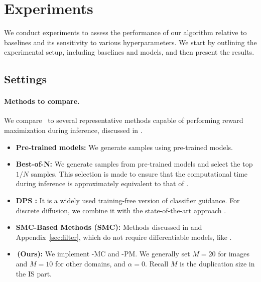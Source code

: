 \vspace{-2mm}
 \section{Experiments}\label{sec:experiment}
\vspace{-2mm}
 We conduct experiments to assess the performance of our algorithm relative to baselines and its sensitivity to various hyperparameters. We start by outlining the experimental setup, including baselines and models, and then present the results.

\vspace{-2mm}
\subsection{Settings}
\vspace{-2mm}



{ \paragraph{Methods to compare.} 
We compare \alg\ to several representative methods capable of performing reward maximization during inference, discussed in .   
\vspace{-2mm}
\begin{itemize}[leftmargin=*] 
    \item \textbf{Pre-trained models:} We generate samples using pre-trained models.
    \item \textbf{Best-of-N:} We generate samples from pre-trained models and select the top $1/N$ samples. This selection is made to ensure that the computational time during inference is approximately equivalent to that of \alg. 
    \item \textbf{DPS \citep{chung2022diffusion}:} It is a widely used training-free version of classifier guidance. For discrete diffusion, we combine it with the state-of-the-art approach \citep{nisonoff2024unlocking}.
    \item \textbf{SMC-Based Methods (SMC):} Methods discussed in  and Appendix~\ref{sec:filter}, which do not require differentiable models, like \alg. 
    \item \textbf{\alg\,(Ours):} We implement \alg-MC and \alg-PM. We generally set $M=20$ for images and $M=10$ for other domains, and $\alpha =0$. Recall $M$ is the duplication size in the IS part. %
\end{itemize}} 


